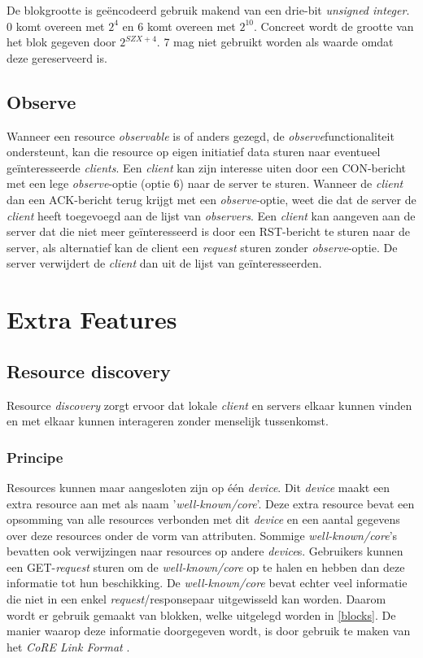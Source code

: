 \noindent
De blokgrootte is ge\"{e}ncodeerd gebruik makend van een drie-bit \textit{unsigned integer}. 0 komt overeen met $ 2^{4} $ en 6 komt overeen met  $ 2^{10} $. Concreet wordt de grootte van het blok gegeven door  $ 2^{ SZX + 4} $. 7 mag niet gebruikt worden als waarde omdat deze gereserveerd is.

\subsection{Observe} \label{observe}

Wanneer een resource \textit{observable} is of anders gezegd, de \textit{observe}functionaliteit ondersteunt, kan die resource op eigen initiatief data sturen naar eventueel ge\"{i}nteresseerde \textit{clients}. Een \textit{client} kan zijn interesse uiten door een CON-bericht met een lege \textit{observe}-optie (optie 6) naar de server te sturen. Wanneer de \textit{client} dan een ACK-bericht terug krijgt met een \textit{observe}-optie, weet die dat de server de \textit{client} heeft toegevoegd aan de lijst van \textit{observers}. Een \textit{client} kan aangeven aan de server dat die niet meer ge\"{i}nteresseerd is door een RST-bericht te sturen naar de server, als alternatief kan de client een \textit{request} sturen zonder \textit{observe}-optie. De server verwijdert de \textit{client} dan uit de lijst van ge\"{i}nteresseerden.

\section{Extra Features}

\subsection{Resource discovery} \label{resourceDiscovery}
Resource \textit{discovery} zorgt ervoor dat lokale \textit{client} en servers elkaar kunnen vinden en met elkaar kunnen interageren zonder menselijk tussenkomst.

\subsubsection{Principe}
\noindent
Resources kunnen maar aangesloten zijn op \'{e}\'{e}n \textit{device}. Dit \textit{device} maakt een extra resource aan met als naam '\textit{well-known/core}'. Deze extra resource bevat een opsomming van alle resources verbonden met dit \textit{device} en een aantal gegevens over deze resources onder de vorm van attributen. Sommige \textit{well-known/core}'s bevatten ook verwijzingen naar resources op andere \textit{device}s. Gebruikers kunnen een GET-\textit{request} sturen om de \textit{well-known/core} op te halen en hebben dan deze informatie tot hun beschikking. De \textit{well-known/core} bevat echter veel informatie die niet in een enkel \textit{request}/responsepaar uitgewisseld kan worden. Daarom wordt er gebruik gemaakt van blokken, welke uitgelegd worden in \ref{blocks}. De manier waarop deze informatie doorgegeven wordt, is door gebruik te maken van het \textit{CoRE Link Format} \cite{coapDiscovery}.

